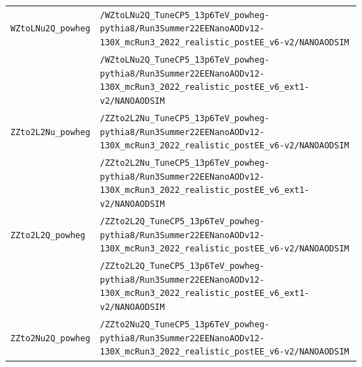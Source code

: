\begin{longtable}{@{}>{\RaggedRight\arraybackslash}p{} >{\RaggedRight\arraybackslash}p{}@{}}
\addlinespace[2pt]
\texttt{WZtoLNu2Q\_\allowbreak{}powheg} & \texttt{/\allowbreak{}WZtoLNu2Q\_\allowbreak{}TuneCP5\_\allowbreak{}13p6TeV\_\allowbreak{}powheg-\allowbreak{}pythia8/\allowbreak{}Run3Summer22EENanoAODv12-\allowbreak{}130X\_\allowbreak{}mcRun3\_\allowbreak{}2022\_\allowbreak{}realistic\_\allowbreak{}postEE\_\allowbreak{}v6-\allowbreak{}v2/\allowbreak{}NANOAODSIM} \\
 & \texttt{/\allowbreak{}WZtoLNu2Q\_\allowbreak{}TuneCP5\_\allowbreak{}13p6TeV\_\allowbreak{}powheg-\allowbreak{}pythia8/\allowbreak{}Run3Summer22EENanoAODv12-\allowbreak{}130X\_\allowbreak{}mcRun3\_\allowbreak{}2022\_\allowbreak{}realistic\_\allowbreak{}postEE\_\allowbreak{}v6\_\allowbreak{}ext1-\allowbreak{}v2/\allowbreak{}NANOAODSIM} \\
\addlinespace[2pt]
\texttt{ZZto2L2Nu\_\allowbreak{}powheg} & \texttt{/\allowbreak{}ZZto2L2Nu\_\allowbreak{}TuneCP5\_\allowbreak{}13p6TeV\_\allowbreak{}powheg-\allowbreak{}pythia8/\allowbreak{}Run3Summer22EENanoAODv12-\allowbreak{}130X\_\allowbreak{}mcRun3\_\allowbreak{}2022\_\allowbreak{}realistic\_\allowbreak{}postEE\_\allowbreak{}v6-\allowbreak{}v2/\allowbreak{}NANOAODSIM} \\
 & \texttt{/\allowbreak{}ZZto2L2Nu\_\allowbreak{}TuneCP5\_\allowbreak{}13p6TeV\_\allowbreak{}powheg-\allowbreak{}pythia8/\allowbreak{}Run3Summer22EENanoAODv12-\allowbreak{}130X\_\allowbreak{}mcRun3\_\allowbreak{}2022\_\allowbreak{}realistic\_\allowbreak{}postEE\_\allowbreak{}v6\_\allowbreak{}ext1-\allowbreak{}v2/\allowbreak{}NANOAODSIM} \\
\addlinespace[2pt]
\texttt{ZZto2L2Q\_\allowbreak{}powheg} & \texttt{/\allowbreak{}ZZto2L2Q\_\allowbreak{}TuneCP5\_\allowbreak{}13p6TeV\_\allowbreak{}powheg-\allowbreak{}pythia8/\allowbreak{}Run3Summer22EENanoAODv12-\allowbreak{}130X\_\allowbreak{}mcRun3\_\allowbreak{}2022\_\allowbreak{}realistic\_\allowbreak{}postEE\_\allowbreak{}v6-\allowbreak{}v2/\allowbreak{}NANOAODSIM} \\
 & \texttt{/\allowbreak{}ZZto2L2Q\_\allowbreak{}TuneCP5\_\allowbreak{}13p6TeV\_\allowbreak{}powheg-\allowbreak{}pythia8/\allowbreak{}Run3Summer22EENanoAODv12-\allowbreak{}130X\_\allowbreak{}mcRun3\_\allowbreak{}2022\_\allowbreak{}realistic\_\allowbreak{}postEE\_\allowbreak{}v6\_\allowbreak{}ext1-\allowbreak{}v2/\allowbreak{}NANOAODSIM} \\
\addlinespace[2pt]
\texttt{ZZto2Nu2Q\_\allowbreak{}powheg} & \texttt{/\allowbreak{}ZZto2Nu2Q\_\allowbreak{}TuneCP5\_\allowbreak{}13p6TeV\_\allowbreak{}powheg-\allowbreak{}pythia8/\allowbreak{}Run3Summer22EENanoAODv12-\allowbreak{}130X\_\allowbreak{}mcRun3\_\allowbreak{}2022\_\allowbreak{}realistic\_\allowbreak{}postEE\_\allowbreak{}v6-\allowbreak{}v2/\allowbreak{}NANOAODSIM} \\

\end{longtable}

